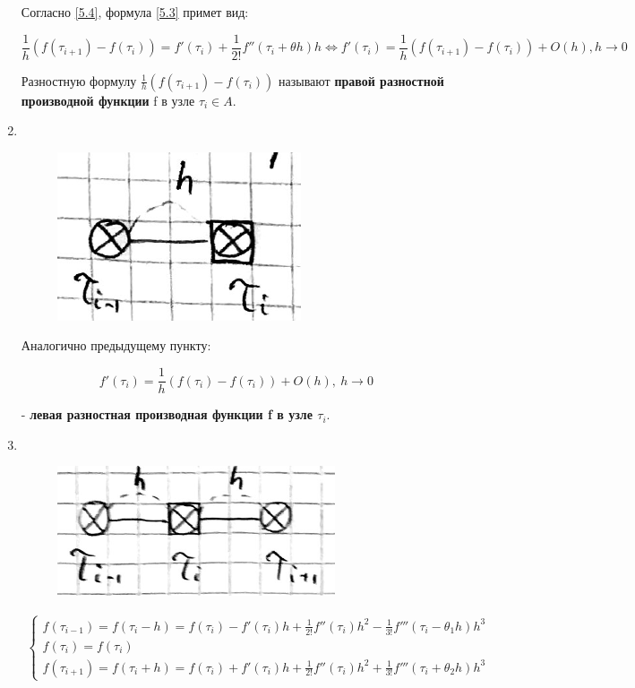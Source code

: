 \documentclass[__main__.tex]{subfiles}
\begin{document}
\begin{enumerate}
	Согласно \ref{5.4}, формула \ref{5.3} примет вид:
	
	\begin{equation}
	\frac{1}{h} \left( f\left( \tau_{i+1}\right) - f \left( \tau_i \right)\right) = f' \left( \tau_i \right) + \frac{1}{2!} f''\left( \tau_i + \theta h \right) h \Leftrightarrow f'\left( \tau_i \right) = \frac{1}{h} \left(f\left( \tau_{i+1}\right) - f \left( \tau_i \right) \right) + O \left(h\right), h\rightarrow 0
	\end{equation}
	
	Разностную формулу $\frac{1}{h} \left( f\left( \tau_{i+1}\right) - f \left( \tau_i \right) \right)$ называют \textbf{правой разностной производной функции} f в узле $\tau_i \in A$.
	
	\item $ $
	\begin{figure}[h!]
		\centering
		\includegraphics[width=0.3\linewidth]{img/img_5-3}
		\caption{}
		\label{img_5.3}
	\end{figure}
	Аналогично предыдущему пункту:
	
	\begin{equation}\label{5.5}
	f'\left( \tau_i \right) = \frac{1}{h} \left( f\left(\tau_i\right) - f\left( \tau_i \right) \right) + O \left( h \right), \ h \rightarrow 0
	\end{equation}
	
	- \textbf{левая разностная производная функции f в узле $\tau_i$}.
	
	\item $ $
	\begin{figure}[h!]
		\centering
		\includegraphics[width=0.4\linewidth]{img/img_5-4}
		\caption{}
		\label{img_5.4}
	\end{figure}
	
	\begin{gather}
	\begin{cases}
	f\left( \tau_{i-1} \right) = f \left( \tau_i - h \right) = f \left( \tau_i \right) - f'\left(\tau_i\right)h + \frac{1}{2!} f''\left( \tau_i \right) h^2 - \frac{1}{3!} f'''\left( \tau_i - \theta_1 h \right) h^3 \\
	f\left(\tau_i \right) = f\left(\tau_i \right) \\
	f\left( \tau_{i+1} \right) = f \left( \tau_i + h \right) = f\left( \tau_i \right) + f'\left( \tau_i \right) h + \frac{1}{2!}f''\left( \tau_i \right) h^2 + \frac{1}{3!} f'''\left( \tau_i + \theta_2 h \right)h^3
	\end{cases}
	\end{gather}
	

\end{enumerate}
\end{document}
